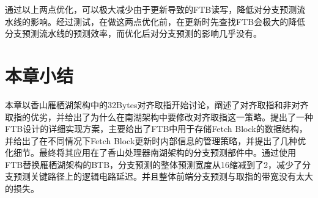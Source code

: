 通过以上两点优化，可以极大减少由于更新导致的FTB读写，降低对分支预测流水线的影响。经过测试，在做这两点优化前，在更新时先查找FTB会极大的降低分支预测流水线的预测效率，而优化后对分支预测的影响几乎没有。


\section{本章小结}

本章以香山雁栖湖架构中的32Bytes对齐取指开始讨论，阐述了对齐取指和非对齐取指的优劣，并给出了为什么在南湖架构中要修改对齐取指这一策略。提出了一种FTB设计的详细实现方案，主要给出了FTB中用于存储Fetch Block的数据结构，并给出了在不同情况下Fetch Block更新时内部信息的管理策略，并提出了几种优化细节。最终将其应用在了香山处理器南湖架构的分支预测部件中。通过使用FTB替换雁栖湖架构的BTB，分支预测的整体预测宽度从16缩减到了2，减少了分支预测关键路径上的逻辑电路延迟。并且整体前端分支预测与取指的带宽没有太大的损失。
